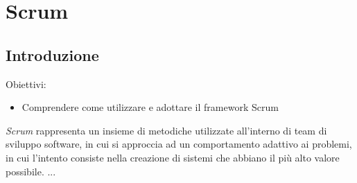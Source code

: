\documentclass{article}
\begin{document}
\pagestyle{empty}
\section*{Scrum}

\subsection*{Introduzione}
\large
Obiettivi:
\begin{itemize}
    \renewcommand{\labelitemi}{-}
    \itemsep0em
    \item Comprendere come utilizzare e adottare il framework Scrum 
\end{itemize}
\textit{Scrum} rappresenta un insieme di metodiche utilizzate all'interno di team di sviluppo software, in cui si approccia ad un comportamento adattivo ai problemi, in cui l'intento consiste nella creazione di sistemi che abbiano il più alto valore possibile. 
...
\end{document}
